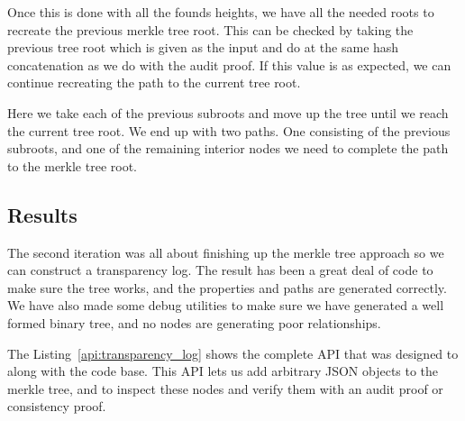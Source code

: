 \documentclass[../Main/thesis.tex]{subfiles}
\begin{document}
Once this is done with all the founds heights, we have all the needed roots to
recreate the previous merkle tree root. This can be checked by taking the
previous tree root which is given as the input and do at the same hash
concatenation as we do with the audit proof. If this value is as expected, we
can continue recreating the path to the current tree root.

Here we take each of the previous subroots and move up the tree until we reach
the current tree root. We end up with two paths. One consisting of the previous
subroots, and one of the remaining interior nodes we need to complete the path
to the merkle tree root.



\subsection*{Results}%
\label{sub:second_iteration_results}
The second iteration was all about finishing up the merkle tree approach so we
can construct a transparency log. The result has been a great deal of code to
make sure the tree works, and the properties and paths are generated correctly.
We have also made some debug utilities to make sure we have generated a well
formed binary tree, and no nodes are generating poor relationships.

The Listing~\ref{api:transparency_log} shows the complete API that was designed
to along with the code base. This API lets us add arbitrary JSON objects to the
merkle tree, and to inspect these nodes and verify them with an audit proof or
consistency proof.
\end{document}
